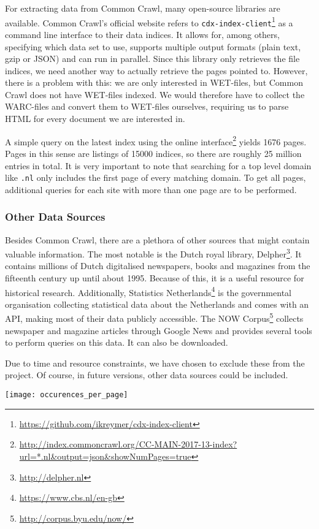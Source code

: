 For extracting data from Common Crawl, many open-source libraries are available. Common Crawl's official website refers to \texttt{cdx-index-client}\footnote{\url{https://github.com/ikreymer/cdx-index-client}} as a command line interface to their data indices. It allows for, among others, specifying which data set to use, supports multiple output formats (plain text, gzip or JSON) and can run in parallel. Since this library only retrieves the file indices, we need another way to actually retrieve the pages pointed to. However, there is a problem with this: we are only interested in WET-files, but Common Crawl does not have WET-files indexed. We would therefore have to collect the WARC-files and convert them to WET-files ourselves, requiring us to parse HTML for every document we are interested in.

A simple query on the latest index using the online interface\footnote{\url{http://index.commoncrawl.org/CC-MAIN-2017-13-index?url=*.nl&output=json&showNumPages=true}} yields 1676 pages. Pages in this sense are listings of 15000 indices, so there are roughly 25 million entries in total. It is very important to note that searching for a top level domain like \texttt{.nl} only includes the first page of every matching domain. To get all pages, additional queries for each site with more than one page are to be performed.


\subsubsection{Other Data Sources}
Besides Common Crawl, there are a plethora of other sources that might contain valuable information. The most notable is the Dutch royal library, Delpher\footnote{\url{http://delpher.nl}}. It contains millions of Dutch digitalised newspapers, books and magazines from the fifteenth century up until about 1995. Because of this, it is a useful resource for historical research. Additionally, Statistics Netherlands\footnote{\url{https://www.cbs.nl/en-gb}} is the governmental organisation collecting statistical data about the Netherlands and comes with an API, making most of their data publicly accessible. The NOW Corpus\footnote{\url{http://corpus.byu.edu/now/}} collects newspaper and magazine articles through Google News and provides several tools to perform queries on this data. It can also be downloaded. 

Due to time and resource constraints, we have chosen to exclude these from the project. Of course, in future versions, other data sources could be included.



\texttt{[image: occurences\_per\_page]}


